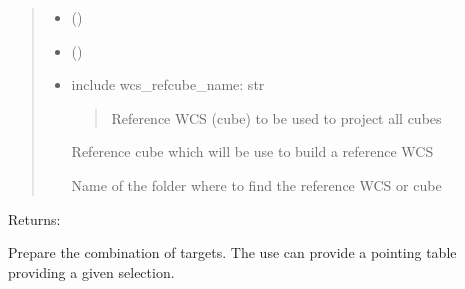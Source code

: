 \documentclass[letterpaper,10pt,english]{sphinxmanual}
\begin{document}
\begin{fulllineitems}
\begin{fulllineitems}
\begin{quote}
\begin{description}
\begin{itemize}
\item {} 
\sphinxAtStartPar
{} () \textendash{} 

\item {} 
\sphinxAtStartPar
{} () \textendash{} 

\item {} 
\sphinxAtStartPar
{} \textendash{} 
\sphinxAtStartPar
include
wcs\_refcube\_name: str
\begin{quote}

\sphinxAtStartPar
Reference WCS (cube) to be used to project all cubes
\end{quote}
\begin{description}
\sphinxAtStartPar
Reference cube which will be use to build a reference WCS

\sphinxAtStartPar
Name of the folder where to find the reference WCS or cube

\end{description}


\end{itemize}

\end{description}\end{quote}

\sphinxAtStartPar
Returns:

\end{fulllineitems}


\begin{fulllineitems}
\label{\detokenize{api/pymusepipe:pymusepipe.target_sample.MusePipeSample.init_combine}}
\pysigstartsignatures
{}
\pysigstopsignatures
\sphinxAtStartPar
Prepare the combination of targets. The use can provide a pointing table providing a
given selection.



\end{fulllineitems}
\end{fulllineitems}
\end{document}
